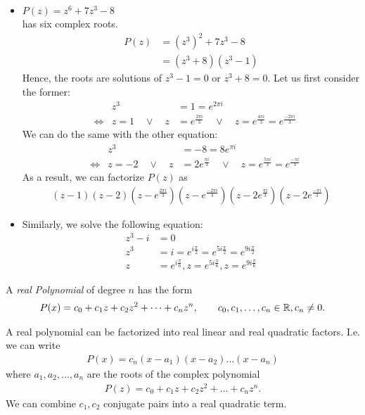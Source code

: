 \begin{ex}
	\begin{itemize}
		\item
	$ \displaystyle
	P(z) = z^6 + 7z^3 -8
	$ \\
	has six complex roots.
	\begin{align*}
	P(z) & = (z^3)^2 + 7z^3 -8 \\
	& = (z^3+8)(z^3-1)
	\end{align*}
	Hence, the roots are solutions of $z^3-1=0$ or $z^3+8 =0$. Let us first consider the former:
	\begin{align*}
	& & z^3 & = 1 = e^{2\pi i} \\
	& \Leftrightarrow & z =1 \quad \vee \quad z & = e^{\frac{2\pi i}{3}} \quad \vee \quad  z = e^{\frac{4\pi i} 3} = e^{\frac{-2\pi i}{3}}
	\end{align*}
	We can do the same with the other equation:
	\begin{align*}
	& & z^3 & = -8 = 8 e^{\pi i} \\
	& \Leftrightarrow & z = -2 \quad \vee \quad z & = 2 e^{\frac{\pi i}{3}} \quad \vee \quad  z = e^{\frac{5\pi i} 3} = e^{\frac{-\pi i}{3}}
	\end{align*}
	As a result, we can factorize $P(z)$ as
	\begin{align*}
	(z-1)(z-2)(z-e^{\frac{2\pi i}{3}})(z-e^{\frac{-2\pi i}{3}}) (z-2e^{\frac{\pi i}{3}})(z-2e^{\frac{-\pi i}{3}})
	\end{align*}
	\item
	Similarly, we solve the following equation:
	\begin{align*}
	z^3 -i & = 0 \\
	z^3 & = i = e^{i \frac \pi 2} = e^{5i \frac \pi 2} = e^{9i \frac \pi 2} \\
	z & = e^{i \frac \pi 6}, z = e^{5 i \frac \pi 6}, z = e^{9 i \frac \pi 6}
	\end{align*}
\end{itemize}
\end{ex}

\begin{df}
	A \emph{real Polynomial} of degree $n$ has the form
	\begin{align*}
	P(x) = c_0 + c_1 z + c_2 z^2 + \dots + c_n z^n, \qquad c_0, c_1, \dots, c_n \in \mathbb R, c_n \neq 0.
	\end{align*}
\end{df}

A real polynomial can be factorized into real linear and real quadratic factors. I.e. we can write
\begin{align*}
P(x) = c_n(x-a_1)(x-a_2) \dots (x-a_n)
\end{align*}
where $a_1,a_2, \dots, a_n$ are the roots of the complex polynomial
\begin{align*}
P(z) = c_0 + c_1 z + c_2 z^2 + \dots + c_n z^n.
\end{align*}
We can combine $c_1, c_2$ conjugate pairs into a real quadratic term.

